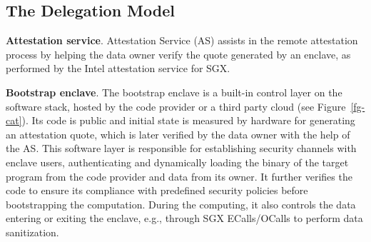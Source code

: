 



\subsection{The Delegation Model}


\vspace{3pt}\noindent\textbf{Attestation service}. Attestation Service (AS) assists in the remote attestation process by helping the data owner verify the quote generated by an enclave, as performed by the Intel attestation service for SGX. 


\vspace{3pt}\noindent\textbf{Bootstrap enclave}. The bootstrap enclave is a built-in control layer on the software stack, hosted by the code provider or a third party cloud  (see Figure~\ref{fg-cat}). Its code is public and initial state is measured by hardware for generating an attestation quote, which is later verified by the data owner with the help of the AS. This software layer is responsible for establishing security channels with enclave users, authenticating and dynamically loading the binary of the target program from the code provider and data from its owner. It further verifies the code to ensure its compliance with predefined security policies before bootstrapping the computation. During the computing, it also controls the data entering or exiting the enclave, e.g., through SGX ECalls/OCalls to perform data sanitization.

